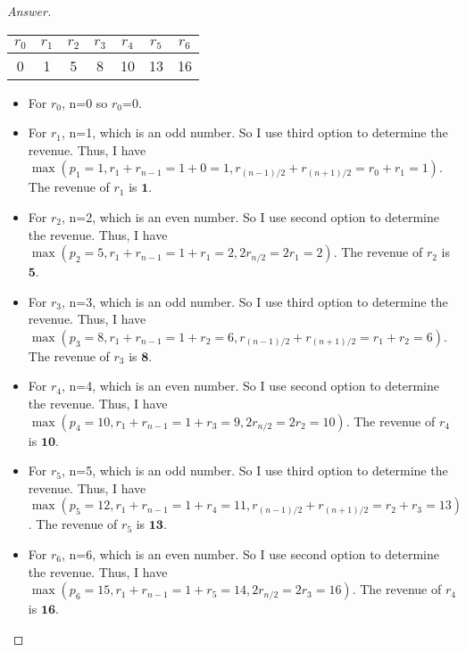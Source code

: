 \documentclass[11pt]{article}
\theoremstyle{definition}
\theoremstyle{definition}
\theoremstyle{definition}
\begin{document}
\begin{proof}[Answer]
\begin{center}
	\begin{tabular}{|c|c|c|c|c|c|c|}
	\hline
	$r_0$ & $r_{1}$ & $r_{2}$ & $r_{3}$ & $r_{4}$ & $r_{5}$ & $r_{6}$ \\ \hline
       0 &1 &5 &8 & 10&13 &16 \\ \hline
	\end{tabular}
\end{center}
\begin{itemize}
\item For $r_0$, n=0 so $r_0$=0.

\item For $r_1$, n=1, which is an odd number. So I use third option to determine the revenue. Thus, I have $\max(p_1=1, r_1 + r_{n-1}=1+0=1, r_{(n-1)/2} + r_{(n+1)/2}=r_0+r_1=1)$. The revenue of $r_1$ is $\textbf{1}$.

\item For $r_2$, n=2, which is an even number. So I use second option to determine the revenue. Thus, I have $\max(p_2=5, r_1 + r_{n-1}=1+r_1=2, 2r_{n/2}=2r_1=2) $. The revenue of $r_2$ is $\textbf{5}$.

\item For $r_3$, n=3, which is an odd number. So I use third option to determine the revenue. Thus, I have $\max(p_3=8, r_1 + r_{n-1}=1+r_2=6, r_{(n-1)/2} + r_{(n+1)/2}=r_1+r_2=6)$. The revenue of $r_3$ is $\textbf{8}$.

\item For $r_4$, n=4, which is an even number. So I use second option to determine the revenue. Thus, I have $\max(p_4=10, r_1 + r_{n-1}=1+r_3=9, 2r_{n/2}=2r_2=10) $. The revenue of $r_4$ is $\textbf{10}$.

\item For $r_5$, n=5, which is an odd number. So I use third option to determine the revenue. Thus, I have $\max(p_5=12, r_1 + r_{n-1}=1+r_4=11, r_{(n-1)/2} + r_{(n+1)/2}=r_2+r_3=13)$. The revenue of $r_5$ is $\textbf{13}$.

\item For $r_6$, n=6, which is an even number. So I use second option to determine the revenue. Thus, I have $\max(p_6=15, r_1 + r_{n-1}=1+r_5=14, 2r_{n/2}=2r_3=16) $. The revenue of $r_4$ is $\textbf{16}$.
\end{itemize}

\end{proof}

\end{document}

